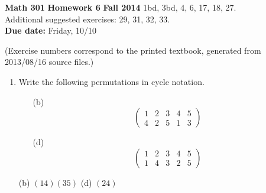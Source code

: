 \documentclass[12pt,reqno]{amsart}
\newcommand{\<}{\ensuremath{\langle}}
\renewcommand{\>}{\ensuremath{\rangle}}
\begin{document}
\thispagestyle{empty}

\noindent \textbf{Math 301} \hskip5cm {\bf Homework 6} \hfill {\bf Fall 2014}
\vskip1cm
   1bd, 3bd, 4, 6, 17, 18, 27.\\  
   Additional suggested exercises: 29, 31, 32, 33.  \\
{\bf Due date:} Friday, 10/10

\medskip

\noindent (Exercise numbers correspond to the printed textbook, generated from 2013/08/16 source files.)

\medskip

\begin{enumerate}[{\bf 1.}]

\item %
Write the following permutations in cycle notation.
\begin{multicols}{2}
\begin{enumerate}
\item[(b)]
\[
\begin{pmatrix}
1 & 2 & 3 & 4 & 5 \\
4 & 2 & 5 & 1 & 3
\end{pmatrix}
\]
\item[(d)]
\[
\begin{pmatrix}
1 & 2 & 3 & 4 & 5 \\
1 & 4 & 3 & 2 & 5
\end{pmatrix}
\]

\end{enumerate}
\end{multicols}

\bigskip

 (b) $(14)(35)$\hskip1cm (d) $(24)$
\vskip1cm




\end{enumerate}
\end{document}
